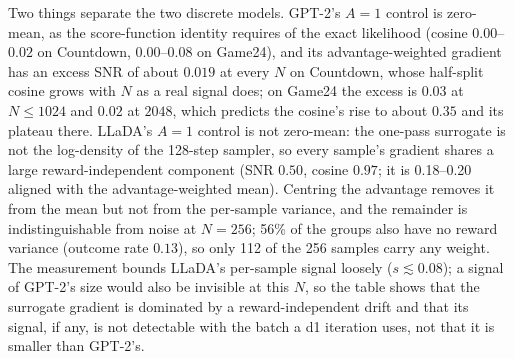 Two things separate the two discrete models. GPT-2's $A{=}1$ control is zero-mean, as the score-function identity requires of the exact likelihood (cosine $0.00$--$0.02$ on Countdown, $0.00$--$0.08$ on Game24), and its advantage-weighted gradient has an excess SNR of about $0.019$ at every $N$ on Countdown, whose half-split cosine grows with $N$ as a real signal does; on Game24 the excess is $0.03$ at $N\le1024$ and $0.02$ at $2048$, which predicts the cosine's rise to about $0.35$ and its plateau there. LLaDA's $A{=}1$ control is not zero-mean: the one-pass surrogate is not the log-density of the 128-step sampler, so every sample's gradient shares a large reward-independent component (SNR $0.50$, cosine $0.97$; it is 0.18--0.20 aligned with the advantage-weighted mean). Centring the advantage removes it from the mean but not from the per-sample variance, and the remainder is indistinguishable from noise at $N{=}256$; 56\% of the groups also have no reward variance (outcome rate $0.13$), so only 112 of the 256 samples carry any weight. The measurement bounds LLaDA's per-sample signal loosely ($s\lesssim0.08$); a signal of GPT-2's size would also be invisible at this $N$, so the table shows that the surrogate gradient is dominated by a reward-independent drift and that its signal, if any, is not detectable with the batch a d1 iteration uses, not that it is smaller than GPT-2's.
